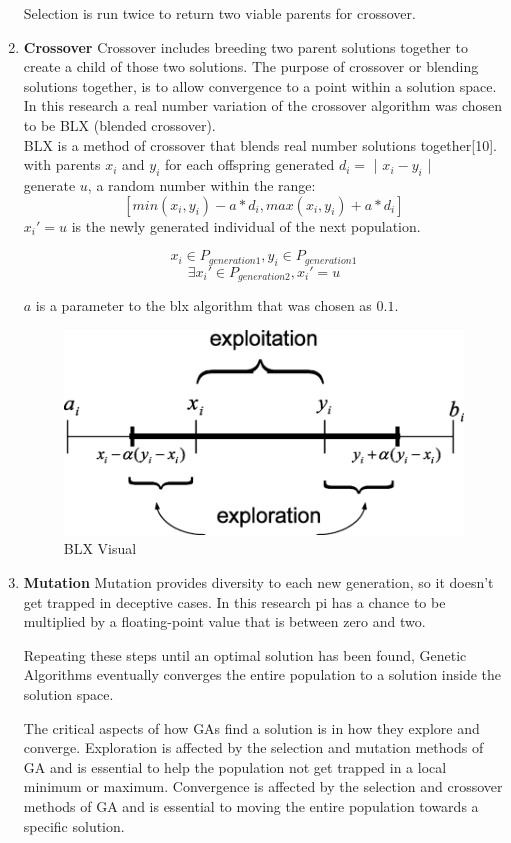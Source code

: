 \documentclass[twocolumn]{article}
\begin{document}
\begin{enumerate}
Selection is run twice to return two viable parents for crossover. 

\item \textbf{Crossover}
Crossover includes breeding two parent solutions together to create a child of those two solutions. The purpose of crossover or blending solutions together, is to allow convergence to a point within a solution space. In this research a real number variation of the crossover algorithm was chosen to be BLX (blended crossover).\\

BLX is a method of crossover that blends real number solutions together[10]. with parents $x_i$ and $y_i$ for each offspring generated $d_i = $ | $x_i - y_i $ |\\

generate $u$, a random number within the range: \\
$$ [ min (x_i, y_i) - a * d_i, max(x_i, y_i) + a * d_i ] $$
$x_i' = u$ is the newly generated individual of the next population.

$$ x_i \in P_{generation1} , y_i \in P_{generation1} $$
$$ \exists x_i' \in P_{generation2} , x_i' = u $$ 

$a$ is a parameter to the blx algorithm that was chosen as $0.1$.

\begin{figure}[h!]
\includegraphics[scale=0.26]{Images/blx.png} 
\caption{BLX Visual}
\end{figure}


\item \textbf{Mutation}
Mutation provides diversity to each new generation, so it doesn't get trapped in deceptive cases. In this research pi has a chance to be multiplied by a floating-point value that is between zero and two.

Repeating these steps until an optimal solution has been found, Genetic Algorithms eventually converges the entire population to a solution inside the solution space.

The critical aspects of how GAs find a solution is in how they explore and converge. Exploration is affected by the selection and mutation methods of GA and is essential to help the population not get trapped in a local minimum or maximum. Convergence is affected by the selection and crossover methods of GA and is essential to moving the entire population towards a specific solution.
\end{enumerate}
\end{document}
